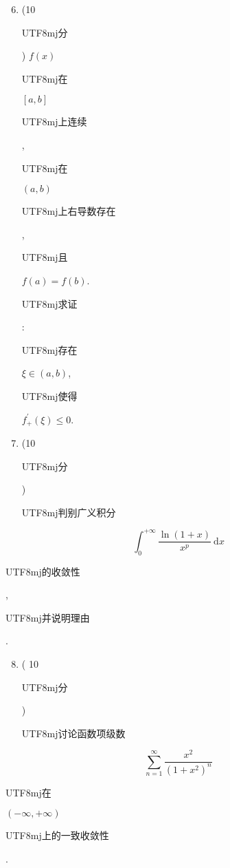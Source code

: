 \documentclass[10pt]{article}
\begin{document}
\begin{enumerate}
  \setcounter{enumi}{5}
  \item (10 \begin{CJK}{UTF8}{mj}分\end{CJK}) $f(x)$ \begin{CJK}{UTF8}{mj}在\end{CJK} $[a, b]$ \begin{CJK}{UTF8}{mj}上连续\end{CJK}, \begin{CJK}{UTF8}{mj}在\end{CJK} $(a, b)$ \begin{CJK}{UTF8}{mj}上右导数存在\end{CJK}, \begin{CJK}{UTF8}{mj}且\end{CJK} $f(a)=f(b)$. \begin{CJK}{UTF8}{mj}求证\end{CJK}: \begin{CJK}{UTF8}{mj}存在\end{CJK} $\xi \in(a, b)$, \begin{CJK}{UTF8}{mj}使得\end{CJK} $f_{+}^{\prime}(\xi) \leq 0$.

  \item (10 \begin{CJK}{UTF8}{mj}分\end{CJK}) \begin{CJK}{UTF8}{mj}判别广义积分\end{CJK}

\end{enumerate}
$$
\int_{0}^{+\infty} \frac{\ln (1+x)}{x^{p}} \mathrm{~d} x
$$
\begin{CJK}{UTF8}{mj}的收敛性\end{CJK}, \begin{CJK}{UTF8}{mj}并说明理由\end{CJK}.

\begin{enumerate}
  \setcounter{enumi}{7}
  \item ( 10 \begin{CJK}{UTF8}{mj}分\end{CJK}) \begin{CJK}{UTF8}{mj}讨论函数项级数\end{CJK}
\end{enumerate}
$$
\sum_{n=1}^{\infty} \frac{x^{2}}{\left(1+x^{2}\right)^{n}}
$$
\begin{CJK}{UTF8}{mj}在\end{CJK} $(-\infty,+\infty)$ \begin{CJK}{UTF8}{mj}上的一致收敛性\end{CJK}.
\end{document}
